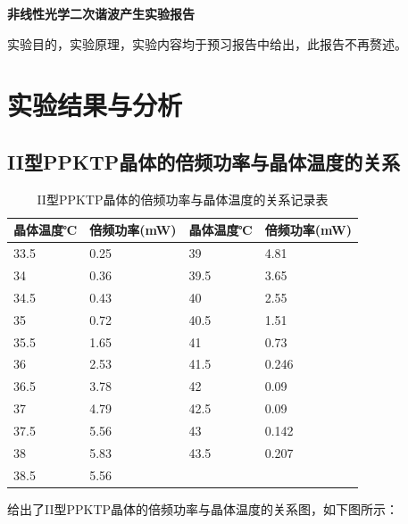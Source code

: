 \documentclass[a4paper,UTF8]{ctexart}
\begin{document}
\begin{center}
    \textbf{\Large 非线性光学二次谐波产生实验报告}
    \par {}
\end{center}

实验目的，实验原理，实验内容均于预习报告中给出，此报告不再赘述。

\section{实验结果与分析}

\subsection{II型PPKTP晶体的倍频功率与晶体温度的关系}

\begin{table}[H]
    \centering
    \caption{II型PPKTP晶体的倍频功率与晶体温度的关系记录表}
    \begin{tabular}{|l|l|l|l|}
    \hline
        晶体温度℃ & 倍频功率(mW) & 晶体温度℃ & 倍频功率(mW) \\ \hline
        33.5 & 0.25 & 39 & 4.81 \\ \hline
        34 & 0.36 & 39.5 & 3.65 \\ \hline
        34.5 & 0.43 & 40 & 2.55 \\ \hline
        35 & 0.72 & 40.5 & 1.51 \\ \hline
        35.5 & 1.65 & 41 & 0.73 \\ \hline
        36 & 2.53 & 41.5 & 0.246 \\ \hline
        36.5 & 3.78 & 42 & 0.09 \\ \hline
        37 & 4.79 & 42.5 & 0.09 \\ \hline
        37.5 & 5.56 & 43 & 0.142 \\ \hline
        38 & 5.83 & 43.5 & 0.207 \\ \hline
        38.5 & 5.56 & &\\ \hline
    \end{tabular}
\end{table}

给出了II型PPKTP晶体的倍频功率与晶体温度的关系图，如下图所示：
\end{document}
